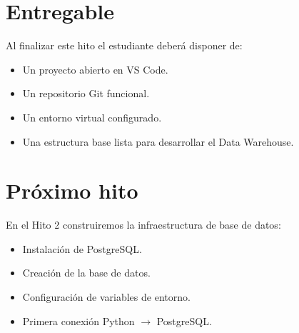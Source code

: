 \section{Entregable}

Al finalizar este hito el estudiante deberá disponer de:

\begin{itemize}
\item Un proyecto abierto en VS Code.
\item Un repositorio Git funcional.
\item Un entorno virtual configurado.
\item Una estructura base lista para desarrollar el Data Warehouse.
\end{itemize}

\section{Próximo hito}

En el Hito 2 construiremos la infraestructura de base de datos:

\begin{itemize}
\item Instalación de PostgreSQL.
\item Creación de la base de datos.
\item Configuración de variables de entorno.
\item Primera conexión Python $\rightarrow$ PostgreSQL.
\end{itemize}
